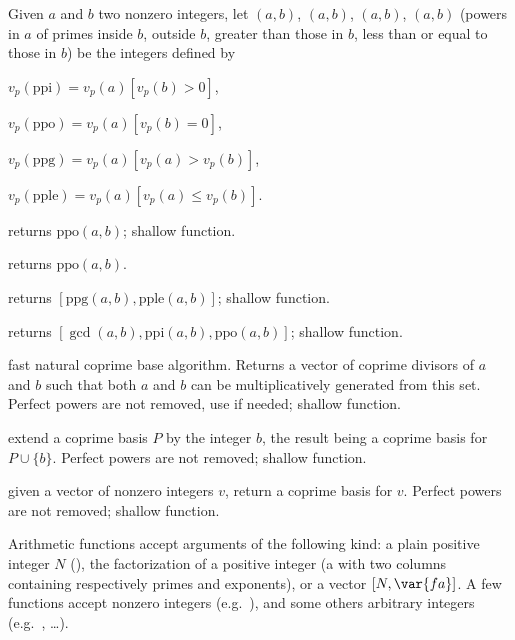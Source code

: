 
Given $a$ and $b$ two nonzero integers, let $(a,b)$, $(a,b)$,
$(a,b)$, $(a,b)$ (powers in $a$ of primes inside $b$,
outside $b$, greater than those in $b$, less than or equal to those in $b$) be
the integers defined by

\item $v_p(\text{ppi}) = v_p(a) [v_p(b) > 0]$,

\item $v_p(\text{ppo}) = v_p(a) [v_p(b) = 0]$,

\item $v_p(\text{ppg}) = v_p(a) [v_p(a) > v_p(b)]$,

\item $v_p(\text{pple}) = v_p(a) [v_p(a) \leq v_p(b)]$.

 returns $\text{ppo}(a,b)$; shallow function.

 returns $\text{ppo}(a,b)$.

 returns $[\text{ppg}(a,b), \text{pple}(a,b)]$;
shallow function.

 returns
$[\gcd(a,b), \text{ppi}(a,b), \text{ppo}(a,b)]$; shallow function.

 fast natural coprime base algorithm. Returns a
vector of coprime divisors of $a$ and $b$ such that both $a$ and $b$ can
be multiplicatively generated from this set. Perfect powers are not removed,
use  if needed; shallow function.

 extend a coprime basis $P$ by the
integer $b$, the result being a coprime basis for $P\cup \{b\}$.
Perfect powers are not removed; shallow function.

 given a vector of nonzero integers $v$, return
a coprime basis for $v$. Perfect powers are not removed; shallow function.


Arithmetic functions accept arguments of the following kind: a plain positive
integer $N$ (), the factorization  of a positive integer (a
 with two columns containing respectively primes and exponents), or
a vector $[N,\var{fa}]$. A few functions accept nonzero
integers (e.g.~), and some others arbitrary integers
(e.g.~, \dots).

